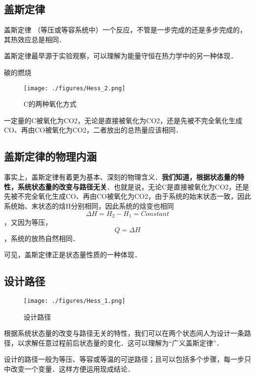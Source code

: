 
\subsection{盖斯定律}
\begin{theorem}{盖斯定律}
（等压或等容系统中）一个反应，不管是一步完成的还是多步完成的，其热效应总是相同．
\end{theorem}
盖斯定律最早源于实验观察，可以理解为能量守恒在热力学中的另一种体现．

\begin{example}{碳的燃烧}
\begin{figure}[ht]
\centering
\texttt{[image: ./figures/Hess\_2.png]}
\caption{C的两种氧化方式} \label{Hess_fig2}
\end{figure}
一定量的C被氧化为CO2，无论是直接被氧化为CO2，还是先被不完全氧化生成CO、再由CO被氧化为CO2，二者放出的总热量应该相同．
\end{example}

\subsection{盖斯定律的物理内涵}
事实上，盖斯定律有着更为基本、深刻的物理含义．\textbf{我们知道，根据状态量的特性，系统状态量的改变与路径无关}．也就是说，无论C是直接被氧化为CO2，还是先被不完全氧化生成CO、再由CO被氧化为CO2，由于系统的始末状态一致，因此系统始、末状态的焓H分别相同，因此系统的焓变也相同$$\Delta H=H_2-H_1=Constant$$，又因为等压，$$Q=\Delta H$$，系统的放热自然相同．

可见，盖斯定律正是状态量性质的一种体现．

\subsection{设计路径}
\begin{figure}[ht]
\centering
\texttt{[image: ./figures/Hess\_1.png]}
\caption{设计路径} \label{Hess_fig1}
\end{figure}

根据系统状态量的改变与路径无关的特性，我们可以在两个状态间人为设计一条路径，以求解任意过程前后状态量的变化．这可以理解为“广义盖斯定律”．

设计的路径一般为等压、等容或等温的可逆路径；且可以包括多个步骤，每一步只中改变一个变量．这样方便运用现成结论．

